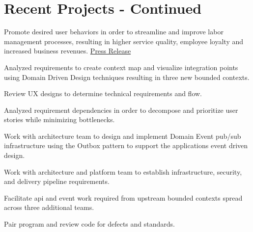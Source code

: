 \documentclass[]{deedy-resume}
\begin{document}
\newpage
%
%
\lastupdated

%
%

\hfill
\begin{minipage}[t]{1.0\textwidth} 


\section{Recent Projects - Continued}
Promote desired user behaviors in order to streamline and improve labor management processes, resulting in higher service quality, employee loyalty and increased business revenues.{ \href{https://www.unifocus.com/newsroom/industry-first-workforce-mgmt-motivation-engagement-with-gamification-capabilities}{Press Release}}
\vspace{\topsep} %
\begin{tightemize}
\item Analyzed requirements to create context map and visualize integration points using Domain Driven Design techniques resulting in three new bounded contexts.
\item Review UX designs to determine technical requirements and flow.
\item Analyzed requirement dependencies in order to decompose and prioritize user stories while minimizing bottlenecks. 
\item Work with architecture team to design and implement Domain Event pub/sub infrastructure using the Outbox pattern to support the applications event driven design.
\item Work with architecture and platform team to establish infrastructure, security, and delivery pipeline requirements.
\item Facilitate api and event work required from upstream bounded contexts spread across three additional teams.
\item Pair program and review code for defects and standards.
\end{tightemize}
\sectionsep


\end{minipage}
\end{document}
